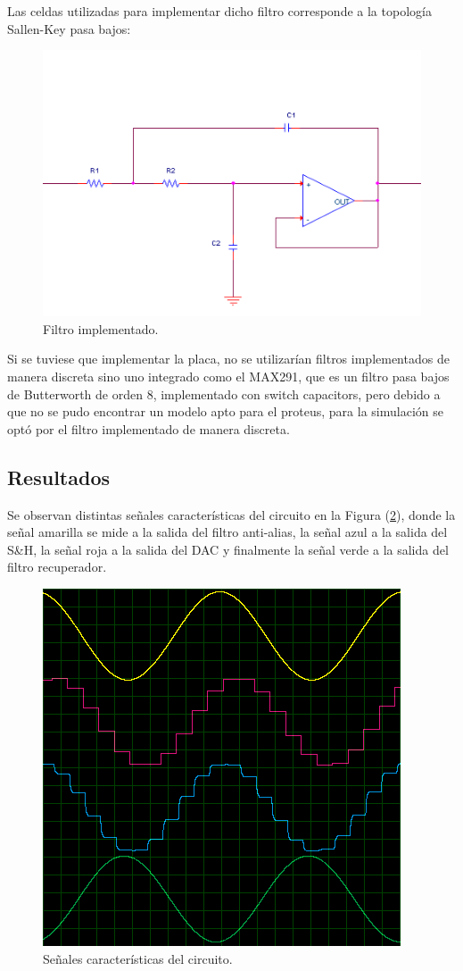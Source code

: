 Las celdas utilizadas para implementar dicho filtro corresponde a la topología Sallen-Key pasa bajos:
\begin{figure}[H]
\centering
\includegraphics[width=0.8\linewidth, page=1]{ImagenesEjercicio1/SK_LP.png}
\caption{Filtro implementado.}
\label{filtros}
\end{figure}
Si se tuviese que implementar la placa, no se utilizarían filtros implementados de manera discreta sino uno integrado como el MAX291, que es un filtro pasa bajos de Butterworth de orden 8, implementado con switch capacitors, pero debido a que no se pudo encontrar un modelo apto para el proteus, para la simulación se optó por el filtro implementado de manera discreta.
\subsection{Resultados}

Se observan distintas señales características del circuito en la Figura (\ref{result1}), donde la señal amarilla se mide a la salida del filtro anti-alias, la señal azul a la salida del S\&H, la señal roja a la salida del DAC y finalmente la señal verde a la salida del filtro recuperador.

\begin{figure}[H]
\centering
\includegraphics[width=0.5\linewidth, page=1]{ImagenesEjercicio1/result1.png}
\caption{Señales características del circuito.}
\label{result1}
\end{figure}

